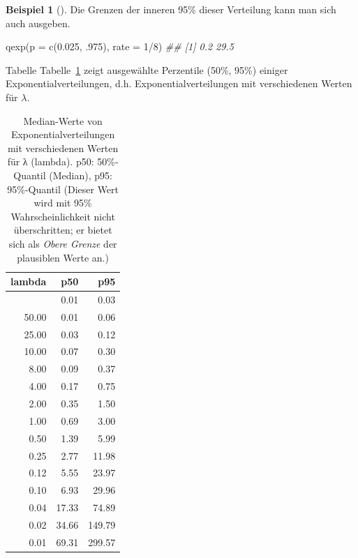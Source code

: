 \documentclass[
  ngerman,
  letterpaper,
  twoside,
  open=any]{scrbook}
\newenvironment{Shaded}{\begin{snugshade}}{\end{snugshade}}
\newcommand{\AttributeTok}[1]{\textcolor[rgb]{0.40,0.45,0.13}{#1}}
\newcommand{\DecValTok}[1]{\textcolor[rgb]{0.68,0.00,0.00}{#1}}
\newcommand{\DocumentationTok}[1]{\textcolor[rgb]{0.37,0.37,0.37}{\textit{#1}}}
\newcommand{\FloatTok}[1]{\textcolor[rgb]{0.68,0.00,0.00}{#1}}
\newcommand{\FunctionTok}[1]{\textcolor[rgb]{0.28,0.35,0.67}{#1}}
\newcommand{\NormalTok}[1]{\textcolor[rgb]{0.00,0.23,0.31}{#1}}
\newcommand{\SpecialCharTok}[1]{\textcolor[rgb]{0.37,0.37,0.37}{#1}}
\theoremstyle{definition}
\newtheorem{example}{Beispiel}[chapter]
\theoremstyle{plain}
\theoremstyle{definition}
\theoremstyle{definition}
\theoremstyle{remark}
\begin{document}
\begin{example}[]
Die Grenzen der inneren 95\% dieser Verteilung kann man sich auch
ausgeben.

\begin{Shaded}
\begin{Highlighting}[]
\FunctionTok{qexp}\NormalTok{(}\AttributeTok{p =} \FunctionTok{c}\NormalTok{(}\FloatTok{0.025}\NormalTok{, .}\DecValTok{975}\NormalTok{), }\AttributeTok{rate =} \DecValTok{1}\SpecialCharTok{/}\DecValTok{8}\NormalTok{)}
\DocumentationTok{\#\# [1]  0.2 29.5}
\end{Highlighting}
\end{Shaded}

Tabelle Tabelle~\ref{tbl-exp} zeigt ausgewählte Perzentile (50\%, 95\%)
einiger Exponentialverteilungen, d.h. Exponentialverteilungen mit
verschiedenen Werten für \(\lambda\).

{

\begin{longtable}[]{@{}rrr@{}}

\caption{\label{tbl-exp}Median-Werte von Exponentialverteilungen mit
verschiedenen Werten für λ (lambda). p50: 50\%-Quantil (Median), p95:
95\%-Quantil (Dieser Wert wird mit 95\% Wahrscheinlichkeit nicht
überschritten; er bietet sich als \emph{Obere Grenze} der plausiblen
Werte an.)}

\tabularnewline

\toprule\noalign{}
lambda & p50 & p95 \\
\midrule\noalign{}
\endhead
\bottomrule\noalign{}
\endlastfoot
100.00 & 0.01 & 0.03 \\
50.00 & 0.01 & 0.06 \\
25.00 & 0.03 & 0.12 \\
10.00 & 0.07 & 0.30 \\
8.00 & 0.09 & 0.37 \\
4.00 & 0.17 & 0.75 \\
2.00 & 0.35 & 1.50 \\
1.00 & 0.69 & 3.00 \\
0.50 & 1.39 & 5.99 \\
0.25 & 2.77 & 11.98 \\
0.12 & 5.55 & 23.97 \\
0.10 & 6.93 & 29.96 \\
0.04 & 17.33 & 74.89 \\
0.02 & 34.66 & 149.79 \\
0.01 & 69.31 & 299.57 \\

\end{longtable}

}
\end{example}
\end{document}
